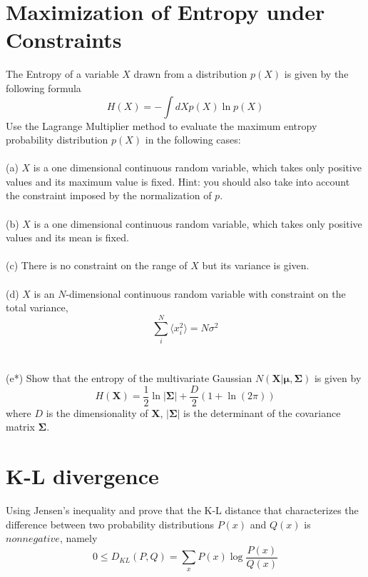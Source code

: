 \documentclass{article}
\begin{document}
 \section*{Maximization of Entropy under Constraints}

The Entropy of a variable $X$ drawn from a distribution $p(X)$ is given by the following formula
\begin{equation}
H(X) = -\int dX p(X) \ln p(X)
\end{equation}
Use the Lagrange Multiplier method to evaluate the maximum entropy probability distribution $p(X)$ in the following cases:
\\
\\
(a) $X$ is a one dimensional continuous random variable, which takes only positive values and its maximum value is fixed. Hint: you should also take into account the constraint imposed by the normalization of $p$.
\\
\\
(b) $X$ is a one dimensional continuous random variable, which takes only positive values and its mean is fixed.
 \\
 \\
(c) There is no constraint on the range of $X$ but its variance is given.
\\
\\
(d) $X$ is an $N$-dimensional continuous random variable with constraint on the total variance,
 \begin{equation}
 \sum_i^N \langle x_i^2 \rangle = N\sigma^2
 \end{equation}
\\
\\
(e*) Show that the entropy of the multivariate Gaussian $N(\mathbf{X}|\mathbf{\mu},\mathbf{\Sigma})$ is given by
\begin{equation}
H(\mathbf{X}) = \frac{1}{2}\ln |\mathbf{\Sigma}| + \frac{D}{2}(1+\ln(2\pi))
\end{equation}
where $D$ is the dimensionality of $\mathbf{X}$,  $|\mathbf{\Sigma}|$ is the determinant of the covariance matrix $\mathbf{\Sigma}$. 

\section*{K-L divergence}
Using Jensen's inequality and prove that the K-L distance that characterizes the difference between two probability distributions $P(x)$ and $Q(x)$ is $nonnegative$, namely 
\begin{equation}
0\leq D_{KL}(P,Q) = \sum_x P(x) \log \frac{P(x)}{Q(x)}  
\end{equation}
\end{document}
